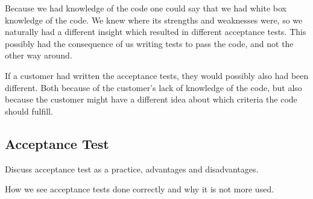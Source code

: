 Because we had knowledge of the code one could say that we had white box knowledge of the code. We knew where its strengths and weaknesses were, so we naturally had a different insight which resulted in different acceptance tests.
This possibly had the consequence of us writing tests to pass the code, and not the other way around. 

If a customer had written the acceptance tests, they would possibly also had been different. Both because of the customer's lack of knowledge of the code, but also because the customer might have a different idea about which criteria the code should fulfill.

\subsection{Acceptance Test}
Discuss acceptance test as a practice, advantages and disadvantages.

How we see acceptance tests done correctly and why it is not more used.
